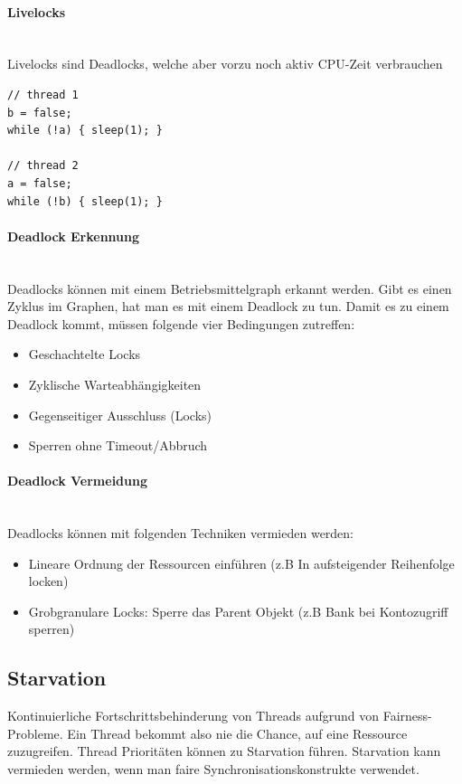 \paragraph{Livelocks} \hfill \\
Livelocks sind Deadlocks, welche aber vorzu noch aktiv CPU-Zeit verbrauchen
\begin{lstlisting}
// thread 1
b = false;
while (!a) { sleep(1); }

// thread 2
a = false;
while (!b) { sleep(1); }
\end{lstlisting}



\paragraph{Deadlock Erkennung} \hfill \\
Deadlocks können mit einem Betriebsmittelgraph erkannt werden. Gibt es einen Zyklus im Graphen, hat man es mit einem Deadlock zu tun. Damit es zu einem Deadlock kommt, müssen folgende vier Bedingungen zutreffen:
\begin{itemize}
	\item Geschachtelte Locks
	\item Zyklische Warteabhängigkeiten
	\item Gegenseitiger Ausschluss (Locks)
	\item Sperren ohne Timeout/Abbruch
\end{itemize}

\paragraph{Deadlock Vermeidung} \hfill \\
Deadlocks können mit folgenden Techniken vermieden werden:
\begin{itemize}
	\item Lineare Ordnung der Ressourcen einführen (z.B In aufsteigender Reihenfolge locken)
	\item Grobgranulare Locks: Sperre das Parent Objekt (z.B Bank bei Kontozugriff sperren)
\end{itemize}

\subsection{Starvation}
Kontinuierliche Fortschrittsbehinderung von Threads aufgrund von Fairness-Probleme. Ein Thread bekommt also nie die Chance, auf eine Ressource zuzugreifen. Thread Prioritäten können zu Starvation führen. Starvation kann vermieden werden, wenn man faire Synchronisationskonstrukte verwendet. 


